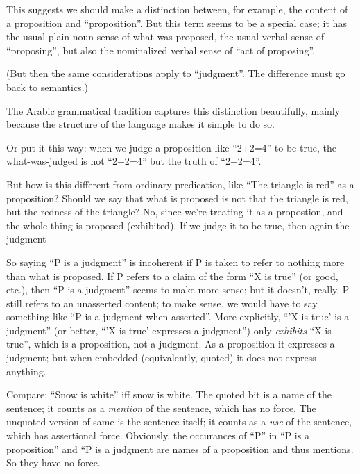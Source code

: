 This suggests we should make a distinction between, for example, the
content of a proposition and ``proposition''.  But this term seems to
be a special case; it has the usual plain noun sense of
what-was-proposed, the usual verbal sense of ``proposing'', but also
the nominalized verbal sense of ``act of proposing''.

(But then the same considerations apply to ``judgment''.  The
difference must go back to semantics.)

\begin{remark}
  The Arabic grammatical tradition captures this distinction
  beautifully, mainly because the structure of the language makes it
  simple to do so.
\end{remark}

Or put it this way: when we judge a proposition like ``2+2=4'' to be
true, the what-was-judged is not ``2+2=4'' but the truth of ``2+2=4''.

\begin{remark}
  But how is this different from ordinary predication, like ``The
  triangle is red'' as a proposition?  Should we say that what is
  proposed is not that the triangle is red, but the redness of the
  triangle?  No, since we're treating it as a propostion, and the
  whole thing is proposed (exhibited).  If we judge it to be true,
  then again the judgment 
\end{remark}

So saying ``P is a judgment'' is incoherent if P is taken to refer to
nothing more than what is proposed.  If P refers to a claim of the
form ``X is true'' (or good, etc.), then ``P is a judgment'' seems to
make more sense; but it doesn't, really.  P still refers to an
unasserted content; to make sense, we would have to say something like
``P is a judgment when asserted''.  More explicitly, ``'X is true' is
a judgment'' (or better, ``'X is true' expresses a judgment'') only
\textit{exhibits} ``X is true'', which is a proposition, not a
judgment.  As a proposition it expresses a judgment; but when embedded
(equivalently, quoted) it does not express anything.

\begin{remark}
  Compare: ``Snow is white'' iff snow is white.  The quoted bit is a
  name of the sentence; it counts as a \textit{mention} of the
  sentence, which has no force.  The unquoted version of same is the
  sentence itself; it counts as a \textit{use} of the sentence, which
  has assertional force.  Obviously, the occurances of ``P'' in ``P is
  a proposition'' and ``P is a judgment are names of a proposition and
  thus mentions.  So they have no force.
\end{remark}

